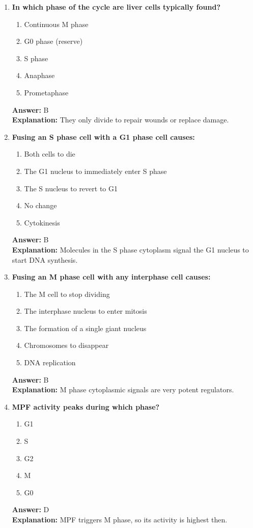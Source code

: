 \documentclass[11pt, a4paper]{article}
\begin{document}
\begin{enumerate}[leftmargin=*, label=\arabic*.]
\item \textbf{In which phase of the cycle are liver cells typically found?}
\begin{enumerate}[label=\Alph*.]
\item Continuous M phase
\item G0 phase (reserve)
\item S phase
\item Anaphase
\item Prometaphase
\end{enumerate}
\textbf{Answer:} B \\
\textbf{Explanation:} They only divide to repair wounds or replace damage.

\item \textbf{Fusing an S phase cell with a G1 phase cell causes:}
\begin{enumerate}[label=\Alph*.]
\item Both cells to die
\item The G1 nucleus to immediately enter S phase
\item The S nucleus to revert to G1
\item No change
\item Cytokinesis
\end{enumerate}
\textbf{Answer:} B \\
\textbf{Explanation:} Molecules in the S phase cytoplasm signal the G1 nucleus to start DNA synthesis.

\item \textbf{Fusing an M phase cell with any interphase cell causes:}
\begin{enumerate}[label=\Alph*.]
\item The M cell to stop dividing
\item The interphase nucleus to enter mitosis
\item The formation of a single giant nucleus
\item Chromosomes to disappear
\item DNA replication
\end{enumerate}
\textbf{Answer:} B \\
\textbf{Explanation:} M phase cytoplasmic signals are very potent regulators.

\item \textbf{MPF activity peaks during which phase?}
\begin{enumerate}[label=\Alph*.]
\item G1
\item S
\item G2
\item M
\item G0
\end{enumerate}
\textbf{Answer:} D \\
\textbf{Explanation:} MPF triggers M phase, so its activity is highest then.


\end{enumerate}
\end{document}
